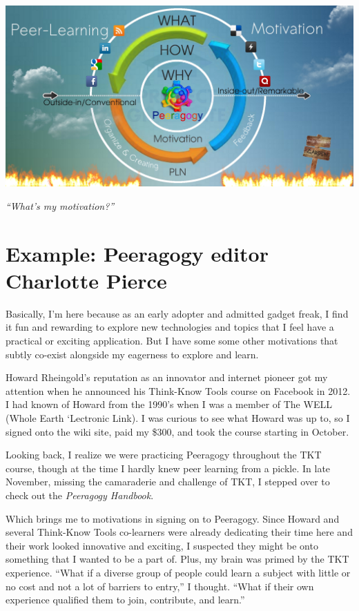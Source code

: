 \begin{center}
\includegraphics[width=.8\textwidth]{../pictures/pln-cycle.jpg}
\end{center}

\emph{``What's my motivation?''}

\section*{Example: Peeragogy editor Charlotte Pierce}

Basically, I'm here because as an early adopter and admitted gadget
freak, I find it fun and rewarding to explore new technologies and
topics that I feel have a practical or exciting application. But I have
some some other motivations that subtly co-exist alongside my eagerness
to explore and learn.

Howard Rheingold's reputation as an innovator and internet pioneer got
my attention when he announced his Think-Know Tools course on Facebook
in 2012. I had known of Howard from the 1990's when I was a member of
The WELL (Whole Earth `Lectronic Link). I was curious to see what Howard
was up to, so I signed onto the wiki site, paid my \$300, and took the
course starting in October.

Looking back, I realize we were practicing Peeragogy throughout the TKT
course, though at the time I hardly knew peer learning from a pickle. In
late November, missing the camaraderie and challenge of TKT, I stepped
over to check out the \emph{Peeragogy Handbook}.

Which brings me to motivations in signing on to Peeragogy. Since Howard
and several Think-Know Tools co-learners were already dedicating their
time here and their work looked innovative and exciting, I suspected
they might be onto something that I wanted to be a part of. Plus, my
brain was primed by the TKT experience. ``What if a diverse group of
people could learn a subject with little or no cost and not a lot of
barriers to entry,'' I thought. ``What if their own experience qualified
them to join, contribute, and learn.''

